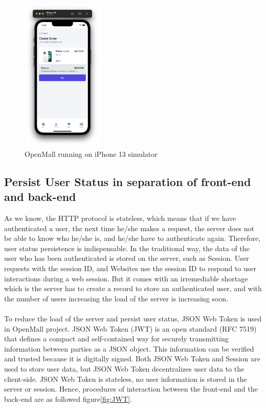 \documentclass{article}
\begin{document}
\begin{figure}[!htp]
    \centering
    \includegraphics[width=0.35\textwidth]{simulator.png}
    \caption{\label{fig:Xcode}OpenMall running on iPhone 13 simulator}
\end{figure}
\clearpage
\subsection{Persist User Status in separation of front-end and back-end}

As we know, the HTTP protocol is stateless, which means that if we have authenticated a user, the next time he/she makes a request, the server does not be able to know who he/she is, and he/she have to authenticate again. Therefore, user status persistence is indispensable. In the traditional way, the data of the user who has been authenticated is stored on the server, such as Session. User requests with the session ID, and Websites use the session ID to respond to user interactions during a web session.\cite{sec} But it comes with an irremediable shortage which is the server has to create a record to store an authenticated user, and with the number of users increasing the load of the server is increasing soon. 
\\\\
To reduce the load of the server and persist user status, JSON Web Token is used in OpenMall project. JSON Web Token (JWT) is an open standard (RFC 7519) that defines a compact and self-contained way for securely transmitting information between parties as a JSON object. This information can be verified and trusted because it is digitally signed.\cite{jwt} Both JSON Web Token and Session are used to store user data, but JSON Web Token decentralizes user data to the client-side. JSON Web Token is stateless, no user information is stored in the server or session. Hence, procedures of interaction between the front-end and the back-end are as followed figure\ref{fig:JWT}.
\end{document}
